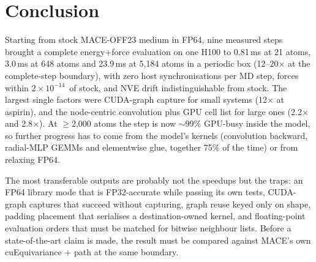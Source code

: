 \section{Conclusion}
\label{sec:conclusion}

Starting from stock MACE-OFF23 medium in FP64, nine measured steps brought a complete energy+force evaluation on one H100 to 0.81\,ms at 21 atoms, 3.0\,ms at 648 atoms and 23.9\,ms at 5{,}184 atoms in a periodic box (12--20$\times$ at the complete-step boundary), with zero host synchronisations per MD step, forces within $2\times10^{-14}$\,\eVA{} of stock, and NVE drift indistinguishable from stock. The largest single factors were CUDA-graph capture for small systems (12$\times$ at aspirin), and the node-centric convolution plus GPU cell list for large ones (2.2$\times$ and 2.8$\times$). At $\ge$2{,}000 atoms the step is now $\sim$99\% GPU-busy inside the model, so further progress has to come from the model's kernels (convolution backward, radial-MLP GEMMs and elementwise glue, together 75\% of the time) or from relaxing FP64.

The most transferable outputs are probably not the speedups but the traps: an FP64 library mode that is FP32-accurate while passing its own tests, CUDA-graph captures that succeed without capturing, graph reuse keyed only on shape, padding placement that serialises a destination-owned kernel, and floating-point evaluation orders that must be matched for bitwise neighbour lists. Before a state-of-the-art claim is made, the result must be compared against MACE's own cuEquivariance +  path at the same boundary.
